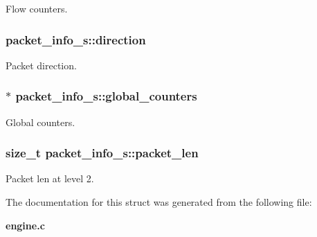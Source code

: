 Flow counters. 

\subsubsection[{direction}]{ packet\_info\_s\+::direction}\label{structpacket__info__s_ac8ab4e7c00ec07b9444c7a52f83eb892}


Packet direction. 

\subsubsection[{global\_counters}]{$\ast$ packet\_info\_s\+::global\_counters}\label{structpacket__info__s_a4d1609e7554b71ba9f97e973aee535ee}


Global counters. 

\subsubsection[{packet\_len}]{\setlength{\rightskip}{0pt plus 5cm}size\_t packet\_info\_s\+::packet\_len}\label{structpacket__info__s_a1f6f94ed26fa196c221624ee9a2a7c6a}


Packet len at level 2. 



The documentation for this struct was generated from the following file\+:\begin{DoxyCompactItemize}
\item 
{\bf engine.\+c}\end{DoxyCompactItemize}
